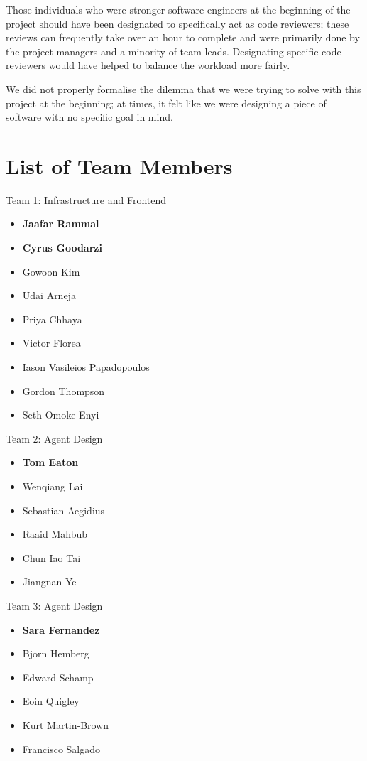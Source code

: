Those individuals who were stronger software engineers at the beginning of the project should have been designated to specifically act as code reviewers; these reviews can frequently take over an hour to complete and were primarily done by the project managers and a minority of team leads. Designating specific code reviewers would have helped to balance the workload more fairly.

We did not properly formalise the dilemma that we were trying to solve with this project at the beginning; at times, it felt like we were designing a piece of software with no specific goal in mind.

\chapter{List of Team Members}\label{sec:cohort-list}
Team 1: Infrastructure and Frontend
\begin{itemize}
    \item \textbf{Jaafar Rammal}
    \item \textbf{Cyrus Goodarzi}
    \item Gowoon Kim
    \item Udai Arneja
    \item Priya Chhaya
    \item Victor Florea
    \item Iason Vasileios Papadopoulos
    \item Gordon Thompson
    \item Seth Omoke-Enyi
\end{itemize}

Team 2: Agent Design
\begin{itemize}
    \item \textbf{Tom Eaton}
    \item Wenqiang Lai
    \item Sebastian Aegidius
    \item Raaid Mahbub
    \item Chun Iao Tai
    \item Jiangnan Ye
\end{itemize}

Team 3: Agent Design
\begin{itemize}
    \item \textbf{Sara Fernandez}
    \item Bjorn Hemberg
    \item Edward Schamp
    \item Eoin Quigley
    \item Kurt Martin-Brown
    \item Francisco Salgado
\end{itemize}

